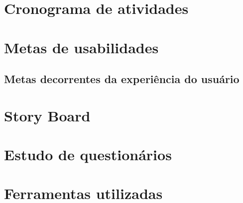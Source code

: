 \section{Cronograma de atividades} %
\label{sec:cronograma_de_atividades}




\section{Metas de usabilidades} %
\label{sec:metas_de_usabilidades}

\subsection{Metas decorrentes da experiência do usuário} %
\label{sub:metas_decorrentes_da_experi_ncia_do_usu_rio}



\section{Story Board} %
\label{sec:story_board}


\section{Estudo de questionários} %
\label{sec:estudo_de_question_rios}



\section{Ferramentas utilizadas} %
\label{sec:ferramentas_utilizadas}

